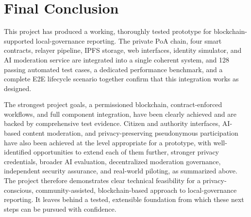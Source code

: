 \section{Final Conclusion}
\label{sec:final-conclusion}

This project has produced a working, thoroughly tested prototype for blockchain-supported local-governance reporting. The private PoA chain, four smart contracts, relayer pipeline, IPFS storage, web interfaces, identity simulator, and AI moderation service are integrated into a single coherent system, and 128 passing automated test cases, a dedicated performance benchmark, and a complete \ac{E2E} lifecycle scenario together confirm that this integration works as designed.

The strongest project goals, a permissioned blockchain, contract-enforced workflows, and full component integration, have been clearly achieved and are backed by comprehensive test evidence. Citizen and authority interfaces, AI-based content moderation, and privacy-preserving pseudonymous participation have also been achieved at the level appropriate for a prototype, with well-identified opportunities to extend each of them further, stronger privacy credentials, broader AI evaluation, decentralized moderation governance, independent security assurance, and real-world piloting, as summarized above. The project therefore demonstrates clear technical feasibility for a privacy-conscious, community-assisted, blockchain-based approach to local-governance reporting. It leaves behind a tested, extensible foundation from which these next steps can be pursued with confidence.
